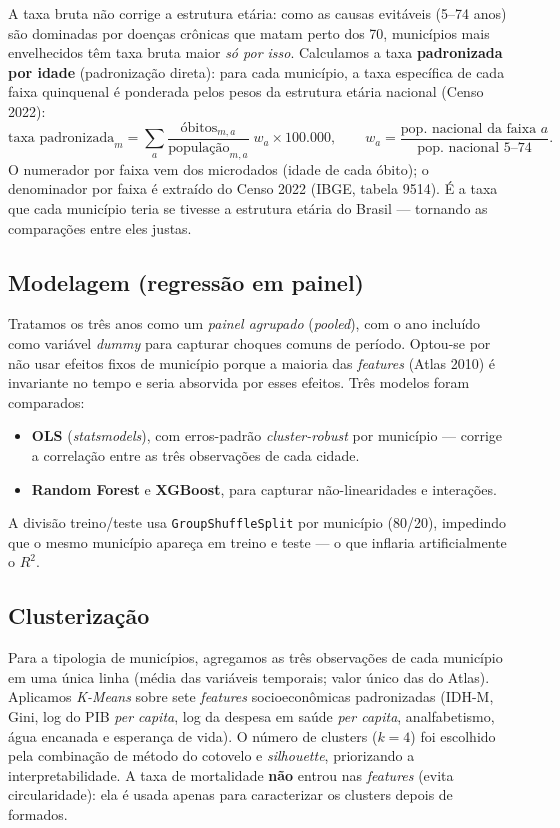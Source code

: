 \documentclass[11pt,a4paper]{article}
\begin{document}
A taxa bruta não corrige a estrutura etária: como as causas evitáveis (5--74 anos) são
dominadas por doenças crônicas que matam perto dos 70, municípios mais envelhecidos têm taxa
bruta maior \emph{só por isso}. Calculamos a taxa \textbf{padronizada por idade} (padronização
direta): para cada município, a taxa específica de cada faixa quinquenal é ponderada pelos
pesos da estrutura etária nacional (Censo 2022):
\[
\text{taxa padronizada}_m = \sum_{a} \frac{\text{óbitos}_{m,a}}{\text{população}_{m,a}}\; w_a \times 100{.}000,
\qquad w_a = \frac{\text{pop. nacional da faixa } a}{\text{pop. nacional 5--74}} .
\]
O numerador por faixa vem dos microdados (idade de cada óbito); o denominador por faixa é
extraído do Censo 2022 (IBGE, tabela 9514). É a taxa que cada município teria se tivesse a
estrutura etária do Brasil --- tornando as comparações entre eles justas.

\subsection{Modelagem (regressão em painel)}

Tratamos os três anos como um \emph{painel agrupado} (\emph{pooled}), com o ano incluído como
variável \emph{dummy} para capturar choques comuns de período. Optou-se por não usar efeitos
fixos de município porque a maioria das \emph{features} (Atlas 2010) é invariante no tempo e
seria absorvida por esses efeitos. Três modelos foram comparados:
\begin{itemize}[nosep]
  \item \textbf{OLS} (\emph{statsmodels}), com erros-padrão \emph{cluster-robust} por
        município --- corrige a correlação entre as três observações de cada cidade.
  \item \textbf{Random Forest} e \textbf{XGBoost}, para capturar não-linearidades e interações.
\end{itemize}
A divisão treino/teste usa \texttt{GroupShuffleSplit} por município (80/20), impedindo que o
mesmo município apareça em treino e teste --- o que inflaria artificialmente o $R^2$.

\subsection{Clusterização}

Para a tipologia de municípios, agregamos as três observações de cada município em uma única
linha (média das variáveis temporais; valor único das do Atlas). Aplicamos \emph{K-Means}
sobre sete \emph{features} socioeconômicas padronizadas (IDH-M, Gini, log do PIB \emph{per
capita}, log da despesa em saúde \emph{per capita}, analfabetismo, água encanada e esperança
de vida). O número de clusters ($k=4$) foi escolhido pela combinação de método do cotovelo e
\emph{silhouette}, priorizando a interpretabilidade. A taxa de mortalidade \textbf{não}
entrou nas \emph{features} (evita circularidade): ela é usada apenas para caracterizar os
clusters depois de formados.
\end{document}
